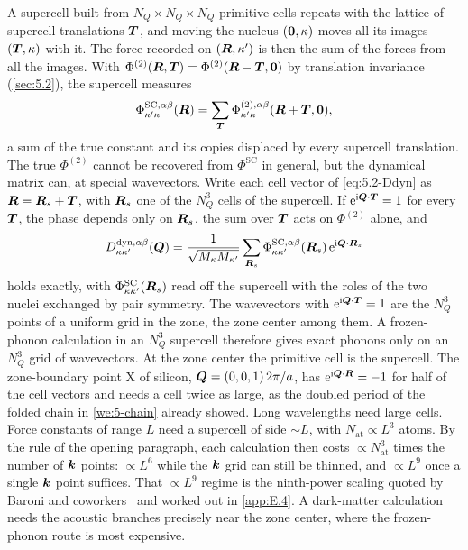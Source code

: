 A supercell built from $N_Q\times N_Q\times N_Q$ primitive cells repeats with the lattice of supercell translations $\bm{T}$, and moving the nucleus $(\bm{0},\kappa)$ moves all its images $(\bm{T},\kappa)$ with it. The force recorded on $(\bm{R},\kappa')$ is then the sum of the forces from all the images. With $\Phi^{(2)}(\bm{R},\bm{T}) = \Phi^{(2)}(\bm{R}-\bm{T},\bm{0})$ by translation invariance (\cref{sec:5.2}), the supercell measures
\begin{equation}
  \Phi^{\mathrm{SC},\alpha\beta}_{\kappa'\kappa}(\bm{R}) = \sum_{\bm{T}}\Phi^{(2),\alpha\beta}_{\kappa'\kappa}(\bm{R}+\bm{T},\bm{0}) ,
  \label{eq:5.4-alias}
\end{equation}
a sum of the true constant and its copies displaced by every supercell translation. The true $\Phi^{(2)}$ cannot be recovered from $\Phi^{\mathrm{SC}}$ in general, but the dynamical matrix can, at special wavevectors. Write each cell vector of \cref{eq:5.2-Ddyn} as $\bm{R} = \bm{R}_s + \bm{T}$, with $\bm{R}_s$ one of the $N_Q^3$ cells of the supercell. If $\mathrm{e}^{\mathrm{i}\bm{Q}\cdot\bm{T}} = 1$ for every $\bm{T}$, the phase depends only on $\bm{R}_s$, the sum over $\bm{T}$ acts on $\Phi^{(2)}$ alone, and
\begin{equation*}
  D^{\mathrm{dyn},\alpha\beta}_{\kappa\kappa'}(\bm{Q}) = \frac{1}{\sqrt{M_\kappa M_{\kappa'}}}\sum_{\bm{R}_s}\Phi^{\mathrm{SC},\alpha\beta}_{\kappa\kappa'}(\bm{R}_s)\,\mathrm{e}^{\mathrm{i}\bm{Q}\cdot\bm{R}_s}
\end{equation*}
holds exactly, with $\Phi^{\mathrm{SC}}_{\kappa\kappa'}(\bm{R}_s)$ read off the supercell with the roles of the two nuclei exchanged by pair symmetry. The wavevectors with $\mathrm{e}^{\mathrm{i}\bm{Q}\cdot\bm{T}} = 1$ are the $N_Q^3$ points of a uniform grid in the zone, the zone center among them. A frozen-phonon calculation in an $N_Q^3$ supercell therefore gives exact phonons only on an $N_Q^3$ grid of wavevectors. At the zone center the primitive cell is the supercell. The zone-boundary point X of silicon, $\bm{Q} = (0,0,1)\,2\pi/a$, has $\mathrm{e}^{\mathrm{i}\bm{Q}\cdot\bm{R}} = -1$ for half of the cell vectors and needs a cell twice as large, as the doubled period of the folded chain in \cref{we:5-chain} already showed. Long wavelengths need large cells. Force constants of range $L$ need a supercell of side $\sim L$, with $N_{\mathrm{at}} \propto L^3$ atoms. By the rule of the opening paragraph, each calculation then costs $\propto N_{\mathrm{at}}^3$ times the number of $\bm{k}$ points: $\propto L^6$ while the $\bm{k}$ grid can still be thinned, and $\propto L^9$ once a single $\bm{k}$ point suffices. That $\propto L^9$ regime is the ninth-power scaling quoted by Baroni and coworkers~\cite[Sect.~IV.B]{baroni2001phonons} and worked out in \cref{app:E.4}. A dark-matter calculation needs the acoustic branches precisely near the zone center, where the frozen-phonon route is most expensive.

